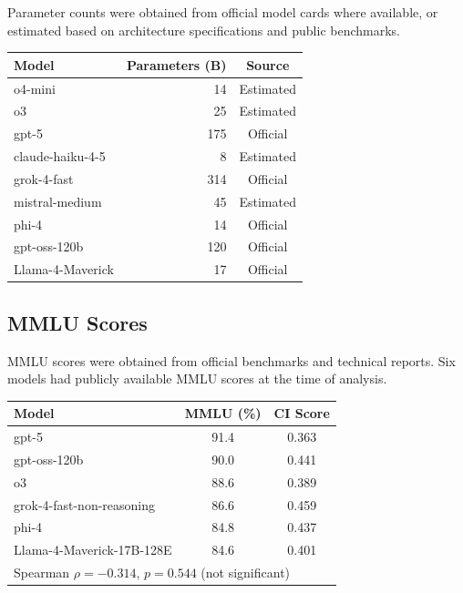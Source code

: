 Parameter counts were obtained from official model cards where available, or
estimated based on architecture specifications and public benchmarks.

\begin{table}[h]
\centering
\begin{tabular}{lrc}
\toprule
\textbf{Model} & \textbf{Parameters (B)} & \textbf{Source} \\
\midrule
o4-mini & 14 & Estimated \\
o3 & 25 & Estimated \\
gpt-5 & 175 & Official \\
claude-haiku-4-5 & 8 & Estimated \\
grok-4-fast & 314 & Official \\
mistral-medium & 45 & Estimated \\
phi-4 & 14 & Official \\
gpt-oss-120b & 120 & Official \\
Llama-4-Maverick & 17 & Official \\
\bottomrule
\end{tabular}
\end{table}

\subsection*{MMLU Scores}

MMLU scores were obtained from official benchmarks and technical reports.
Six models had publicly available MMLU scores at the time of analysis.

\begin{table}[h]
\centering
\begin{tabular}{lcc}
\toprule
\textbf{Model} & \textbf{MMLU (\%)} & \textbf{CI Score} \\
\midrule
gpt-5 & 91.4 & 0.363 \\
gpt-oss-120b & 90.0 & 0.441 \\
o3 & 88.6 & 0.389 \\
grok-4-fast-non-reasoning & 86.6 & 0.459 \\
phi-4 & 84.8 & 0.437 \\
Llama-4-Maverick-17B-128E & 84.6 & 0.401 \\
\bottomrule
\multicolumn{3}{l}{\footnotesize Spearman $\rho = -0.314$, $p = 0.544$ (not significant)} \\
\end{tabular}
\end{table}

